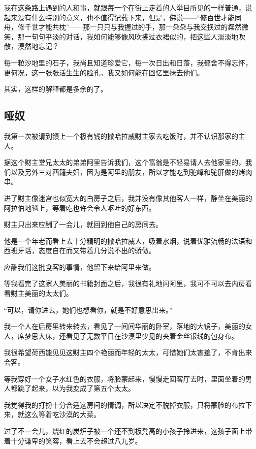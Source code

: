 \par 我在这条路上遇到的人和事，就跟每一个在街上走着的人举目所见的一样普通，说起来没有什么特别的意义，也不值得记载下来，但是，佛说——“修百世才能同舟，修千世才能共枕”——那一只只与我握过的手，那一朵朵与我交换过的粲然微笑，那一句句平淡的对话，我如何能够像风吹拂过衣裙似的，把这些人淡淡地吹散，漠然地忘记？
\par 每一粒沙地里的石子，我尚且知道珍爱它，每一次日出和日落，我都舍不得忘怀，更何况，这一张张活生生的脸孔，我又如何能在回忆里抹去他们。
\par 其实，这样的解释都是多余的了。


\subsection{哑奴}

\par 我第一次被请到镇上一个极有钱的撒哈拉威财主家去吃饭时，并不认识那家的主人。
\par 据这个财主堂兄太太的弟弟阿里告诉我们，这个富翁是不轻易请人去他家里的，我们以及另外三对西籍夫妇，因为是阿里的朋友，所以才能吃到驼峰和驼肝做的烤肉串。
\par 进了财主像迷宫也似宽大的白房子之后，我并没有像其他客人一样，静坐在美丽的阿拉伯地毯上，等着吃也许会令人呕吐的好东西。
\par 财主只出来应酬了一会儿，就回到他自己的房间去。
\par 他是一个年老而看上去十分精明的撒哈拉威人，吸着水烟，说着优雅流畅的法语和西班牙话，态度自在而又带着几分说不出的骄傲。
\par 应酬我们这批食客的事情，他留下来给阿里来做。
\par 等我看完了这家人美丽的书籍封面之后，我很有礼地问阿里，我可不可以去内房看看财主美丽的太太们。
\par “可以，请你进去，她们也想看你，就是不好意思出来。”
\par 我一个人在后房里转来转去，看见了一间间华丽的卧室，落地的大镜子，美丽的女人，席梦思大床，还看见了无数平日在沙漠里少见的夹着金丝银线的包身布。
\par 我很希望荷西能见见这财主四个艳丽而年轻的太太，可惜她们太害羞了，不肯出来会客。
\par 等我穿好一个女子水红色的衣服，将脸蒙起来，慢慢走回客厅去时，里面坐着的男人都跳了起来，以为我变成了第五个太太。
\par 我觉得我的打扮十分合适这房间的情调，所以决定不脱掉衣服，只将蒙脸的布拉下来，就这么等着吃沙漠的大菜。
\par 过了不一会儿，烧红的炭炉子被一个还不到板凳高的小孩子拎进来，这孩子面上带着十分谦卑的笑容，看上去不会超过八九岁。
